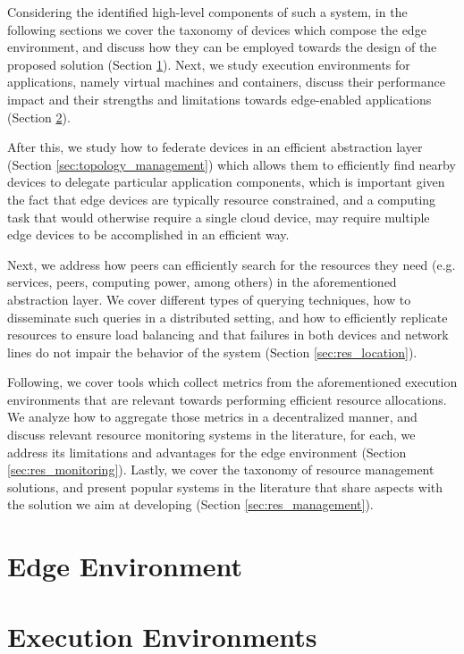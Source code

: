Considering the identified high-level components of such a system, in the following sections we cover the taxonomy of devices which compose the edge environment, and discuss how they can be employed towards the design of the proposed solution (Section \ref{sec:edge_computing}). Next, we study execution environments for applications, namely virtual machines and containers, discuss their performance impact and their strengths and limitations towards edge-enabled applications (Section \ref{sec:runtime_environments}). 

After this, we study how to federate devices in an efficient abstraction layer (Section \ref{sec:topology_management}) which allows them to efficiently find nearby devices to delegate particular application components, which is important given the fact that edge devices are typically resource constrained, and a computing task that would otherwise require a single cloud device, may require multiple edge devices to be accomplished in an efficient way.

Next, we address how peers can efficiently search for the resources they need (e.g. services, peers, computing power, among others) in the aforementioned abstraction layer. We cover different types of querying techniques, how to disseminate such queries in a distributed setting, and how to efficiently replicate resources to ensure load balancing and that failures in both devices and network lines do not impair the behavior of the system (Section \ref{sec:res_location}).

Following, we cover tools which collect metrics from the aforementioned execution environments that are relevant towards performing efficient resource allocations. We analyze how to aggregate those metrics in a decentralized manner, and discuss relevant resource monitoring systems in the literature, for each, we address its limitations and advantages for the edge environment (Section \ref{sec:res_monitoring}). Lastly, we cover the taxonomy of resource management solutions, and present popular systems in the literature that share aspects with the solution we aim at developing (Section \ref{sec:res_management}). 

\section{Edge Environment} \label{sec:edge_computing} 

\section{Execution Environments} \label{sec:runtime_environments} 

